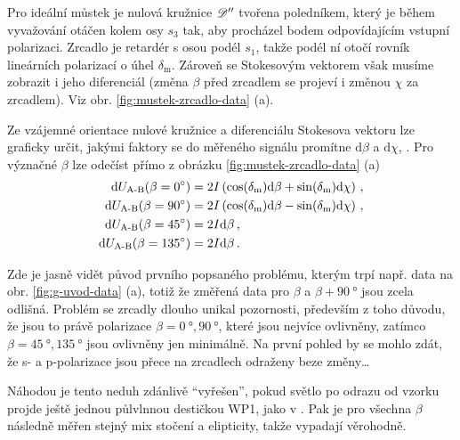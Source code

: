 Pro ideální můstek je nulová kružnice $\mathscr{D}''$ tvořena poledníkem, který je během vyvažování otáčen kolem osy $s_3$ tak, aby procházel bodem odpovídajícím vstupní polarizaci.
Zrcadlo je retardér s osou podél $s_1$, takže podél ní otočí rovník lineárních polarizací o úhel $\delta_\textrm{m}$.
Zároveň se Stokesovým vektorem však musíme zobrazit i jeho diferenciál (změna $\beta$ před zrcadlem se projeví i změnou $\chi$ za zrcadlem).
Viz obr. \ref{fig:mustek-zrcadlo-data} (a).

Ze vzájemné orientace nulové kružnice a diferenciálu Stokesova vektoru lze graficky určit, jakými faktory se do měřeného signálu promítne $\textrm{d}\beta$ a $\textrm{d}\chi$, .
Pro význačné $\beta$ lze odečíst přímo z obrázku \ref{fig:mustek-zrcadlo-data} (a)
\begin{align}
    \textrm{d}U_\textrm{A-B}(\beta=\SI{0}{\degree}) &= 2I\left(\cos(\delta_\textrm{m})\textrm{d}\beta + \sin(\delta_\textrm{m})\textrm{d}\chi\right) \,,\\
    \textrm{d}U_\textrm{A-B}(\beta=\SI{90}{\degree}) &= 2I\left(\cos(\delta_\textrm{m})\textrm{d}\beta - \sin(\delta_\textrm{m})\textrm{d}\chi\right) \,,\\
    \textrm{d}U_\textrm{A-B}(\beta=\SI{45}{\degree}) &= 2I\textrm{d}\beta \,, \label{eqn:must-zrc-1}\\
    \textrm{d}U_\textrm{A-B}(\beta=\SI{135}{\degree}) &= 2I\textrm{d}\beta \,. \label{eqn:must-zrc-2}
\end{align}

Zde je jasně vidět původ prvního popsaného problému, kterým trpí např. data na obr. \ref{fig:g-uvod-data} (a), totiž že změřená data pro $\beta$ a $\beta+\SI{90}{\degree}$ jsou zcela odlišná.
Problém se zrcadly dlouho unikal pozornosti, především z toho důvodu, že jsou to právě polarizace $\beta=\SI{0}{\degree}, \SI{90}{\degree}$, které jsou nejvíce ovlivněny, zatímco $\beta=\SI{45}{\degree}, \SI{135}{\degree}$ jsou ovlivněny jen minimálně.
Na první pohled by se mohlo zdát, že s- a p-polarizace jsou přece na zrcadlech odraženy beze změny\ldots

Náhodou je tento neduh zdánlivě ``vyřešen'', pokud světlo po odrazu od vzorku projde ještě jednou půlvlnnou destičkou WP1, jako v \cite{wohlrathMagnetooptickaCharakterizaceSpintronickych2018,kubascikMagnetooptickeStudiumAntiferomagnetickych2019,kimakOptickaSpektroskopieAntiferomagnetu2019}.
Pak je pro všechna $\beta$ následně měřen stejný mix stočení a elipticity, takže vypadají věrohodně.

